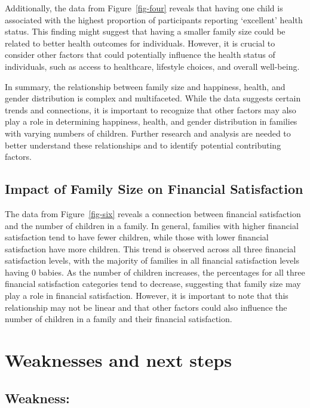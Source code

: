 \documentclass[
  letterpaper,
  DIV=11,
  numbers=noendperiod]{scrartcl}
\begin{document}
Additionally, the data from Figure~\ref{fig-four} reveals that having
one child is associated with the highest proportion of participants
reporting `excellent' health status. This finding might suggest that
having a smaller family size could be related to better health outcomes
for individuals. However, it is crucial to consider other factors that
could potentially influence the health status of individuals, such as
access to healthcare, lifestyle choices, and overall well-being.

In summary, the relationship between family size and happiness, health,
and gender distribution is complex and multifaceted. While the data
suggests certain trends and connections, it is important to recognize
that other factors may also play a role in determining happiness,
health, and gender distribution in families with varying numbers of
children. Further research and analysis are needed to better understand
these relationships and to identify potential contributing factors.

\hypertarget{impact-of-family-size-on-financial-satisfaction}{%
\subsection{Impact of Family Size on Financial
Satisfaction}\label{impact-of-family-size-on-financial-satisfaction}}

The data from Figure~\ref{fig-six} reveals a connection between
financial satisfaction and the number of children in a family. In
general, families with higher financial satisfaction tend to have fewer
children, while those with lower financial satisfaction have more
children. This trend is observed across all three financial satisfaction
levels, with the majority of families in all financial satisfaction
levels having 0 babies. As the number of children increases, the
percentages for all three financial satisfaction categories tend to
decrease, suggesting that family size may play a role in financial
satisfaction. However, it is important to note that this relationship
may not be linear and that other factors could also influence the number
of children in a family and their financial satisfaction.

\hypertarget{weaknesses-and-next-steps}{%
\section{Weaknesses and next steps}\label{weaknesses-and-next-steps}}

\hypertarget{weakness}{%
\subsection{Weakness:}\label{weakness}}
\end{document}
